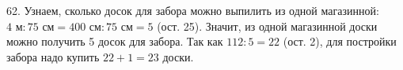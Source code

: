 62. Узнаем, сколько досок для забора можно выпилить из одной магазинной: $4\text{ м}:75\text{ см}=400\text{ см}:75\text{ см}=5$ (ост. 25). Значит, из одной магазинной доски можно получить 5 досок для забора. Так как $112:5=22$ (ост. 2), для постройки забора надо купить $22+1=23$ доски.\\
